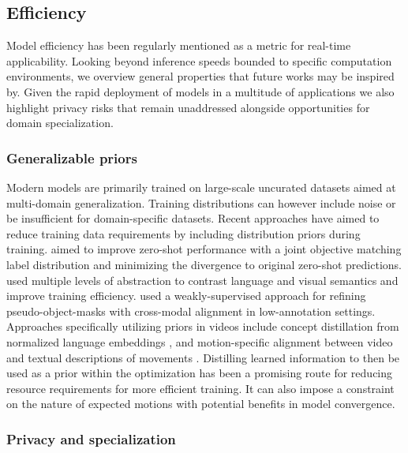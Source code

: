 \subsection{Efficiency}
\label{sec:outlook::efficiency}

Model efficiency has been regularly mentioned as a metric for real-time applicability. Looking beyond inference speeds bounded to specific computation environments, we overview general properties that future works may be inspired by. Given the rapid deployment of models in a multitude of applications we also highlight privacy risks that remain unaddressed alongside opportunities for domain specialization.  

\subsubsection{Generalizable priors}

Modern models are primarily trained on large-scale uncurated datasets aimed at multi-domain generalization. Training distributions can however include noise or be insufficient for domain-specific datasets. Recent approaches have aimed to reduce training data requirements by including distribution priors during training. \citet{kahana2022improving} aimed to improve zero-shot performance with a joint objective matching label distribution and minimizing the divergence to original zero-shot predictions. \citet{gao2022pyramidclip} used multiple levels of abstraction to contrast language and visual semantics and improve training efficiency. \citet{nag2024safari} used a weakly-supervised approach for refining pseudo-object-masks with cross-modal alignment in low-annotation settings. Approaches specifically utilizing priors in videos include concept distillation from normalized language embeddings \citep{ranasinghe2023language}, and motion-specific alignment between video and textual descriptions of movements \citep{zhang2024enhanced}. Distilling learned information to then be used as a prior within the optimization has been a promising route for reducing resource requirements for more efficient training. It can also impose a constraint on the nature of expected motions with potential benefits in model convergence.


\subsubsection{Privacy and specialization}


